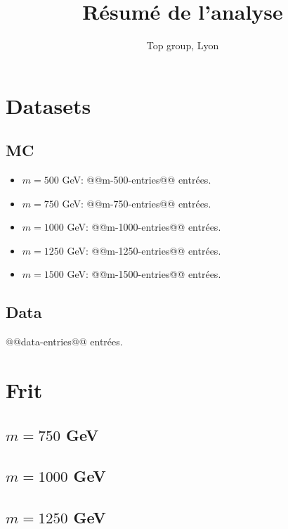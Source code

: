 \documentclass[twoside,12pt]{article}
\title{Résumé de l'analyse}
\author{Top group, Lyon}
\begin{document}
\maketitle
\tableofcontents

\newpage


\section{Datasets}

\subsection{MC}

\begin{itemize}
\item $m = 500$ GeV: @@m-500-entries@@ entrées.
\item $m = 750$ GeV: @@m-750-entries@@ entrées.
\item $m = 1000$ GeV: @@m-1000-entries@@ entrées.
\item $m = 1250$ GeV: @@m-1250-entries@@ entrées.
\item $m = 1500$ GeV: @@m-1500-entries@@ entrées.
\end{itemize}

\subsection{Data}

@@data-entries@@ entrées.

\section{Frit}


\subsection{$m = 750$ GeV}

\subsection{$m = 1000$ GeV}

\subsection{$m = 1250$ GeV}
\end{document}
